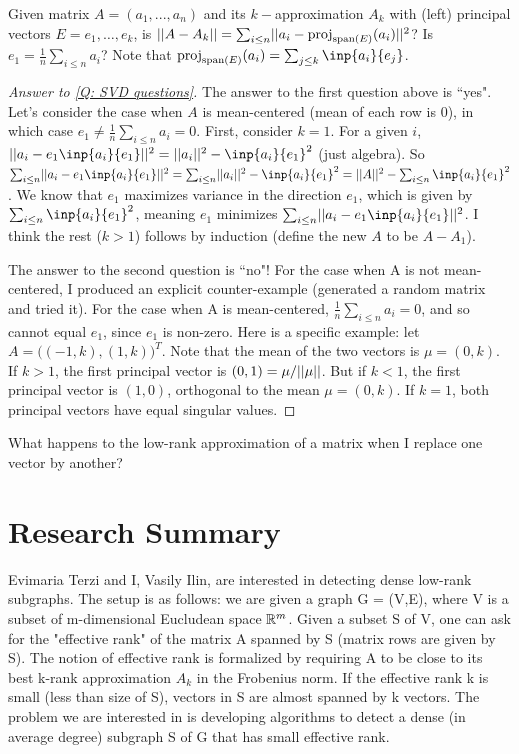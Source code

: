 \documentclass{article}
\begin{document}
\begin{question}\label{Q: SVD questions}
    Given matrix $A = (a_1,...,a_n)$ and its $k-$approximation $A_k$ with (left) principal vectors $E = e_1,\dots,e_k$, is $\norm{A - A_k} = \sum_{i\leq n}\norm{a_i - \proj_{\vspan{E}}(a_i)}^2$? Is $e_1 = \frac{1}{n}\sum_{i\leq n}a_i$? Note that $\proj_{\vspan{E}}(a_i) = \sum_{j\leq k}\inp{a_i}{e_j}$.
\end{question}
\begin{proof}[Answer to \ref{Q: SVD questions}]
The answer to the first question above is ``yes". Let's consider the case when $A$ is mean-centered (mean of each row is 0), in which case $e_1 \neq \frac{1}{n}\sum_{i\leq n}a_i = 0$. First, consider $k=1$. For a given $i$, $\norm{a_i - e_1\inp{a_i}{e_1}}^2 = \norm{a_i}^2 - \inp{a_i}{e_1}^2$ (just algebra). So $\sum_{i\leq n}\norm{a_i - e_1\inp{a_i}{e_1}}^2 = \sum_{i\leq n}\norm{a_i}^2 - \inp{a_i}{e_1}^2 = \norm{A}^2-\sum_{i\leq n}\inp{a_i}{e_1}^2$. We know that $e_1$ maximizes variance in the direction $e_1$, which is given by $\sum_{i\leq n} \inp{a_i}{e_1}^2$, meaning $e_1$ minimizes $\sum_{i\leq n}\norm{a_i - e_1\inp{a_i}{e_1}}^2$. I think the rest ($k>1$) follows by induction (define the new $A$ to be $A-A_1$).

The answer to the second question is ``no"! For the case when A is not mean-centered, I produced an explicit counter-example (generated a random matrix and tried it). For the case when A is mean-centered, $\frac{1}{n}\sum_{i\leq n}a_i = 0$, and so cannot equal $e_1$, since $e_1$ is non-zero. Here is a specific example: let $A = \Big((-1,k),(1,k)\Big)^T$. Note that the mean of the two vectors is $\mu=(0,k)$. If $k>1$, the first principal vector is $(0,1) = \mu/||\mu||$. But if $k<1$, the first principal vector is $(1,0)$, orthogonal to the mean $\mu=(0,k)$. If $k=1$, both principal vectors have equal singular values.
\end{proof}
\begin{question}
    What happens to the low-rank approximation of a matrix when I replace one vector by another?
\end{question}

\section{Research Summary}
Evimaria Terzi and I, Vasily Ilin, are interested in detecting dense low-rank subgraphs. 
The setup is as follows: we are given a graph G = (V,E), where V is a subset of m-dimensional Eucludean space $\mathbb{R}^m$. Given a subset S of V, one can ask for the "effective rank" of the matrix A spanned by S (matrix rows are given by S). The notion of effective rank is formalized by requiring A to be close to its best k-rank approximation $A_k$ in the Frobenius norm. If the effective rank k is small (less than size of S), vectors in S are almost spanned by k vectors. The problem we are interested in is developing algorithms to detect a dense (in average degree) subgraph S of G that has small effective rank. 
\end{document}
